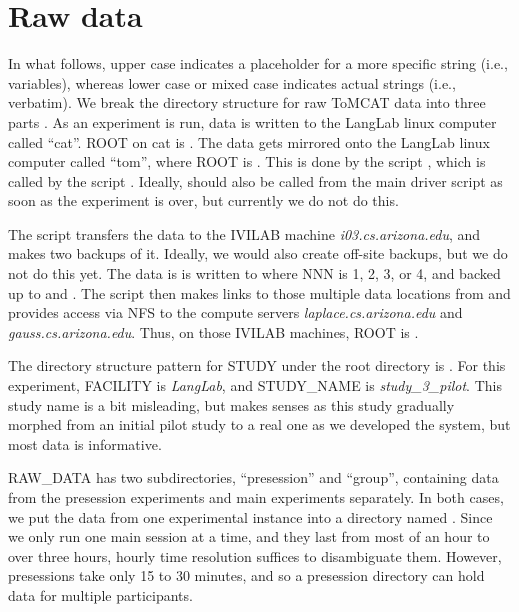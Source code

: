 \section{Raw data}

In what follows, upper case indicates
a placeholder for a more specific string (i.e., variables), whereas lower case or mixed case
indicates actual strings (i.e., verbatim).
We break the directory structure for raw ToMCAT data into three parts
. 
As an experiment is run, data is written to the LangLab linux computer called
``cat''. ROOT on cat is
. The data gets mirrored onto the LangLab linux computer called
``tom'', where ROOT is . 
This is done by the script , which is called by the script 
. Ideally,  should also be
called from the main driver script as soon as the experiment is over, but
currently we do not do this. 

The script  transfers the data to the IVILAB machine
\textit{i03.cs.arizona.edu}, and makes two backups of it.  Ideally, we would
also create off-site backups, but we do not do this yet. The data is is
written to
 where NNN is 1, 2, 3, or 4, and backed up to 
 and .  
The script  then makes links to those multiple data
locations from  and provides access via NFS to the compute
servers \textit{laplace.cs.arizona.edu} and \textit{gauss.cs.arizona.edu}.
Thus, on those IVILAB machines, ROOT is .

The directory structure pattern for STUDY under the root directory is
. For this experiment, FACILITY is
\textit{LangLab}, and STUDY\_NAME is \textit{study\_3\_pilot}.
This study name is a bit misleading, but makes senses as this study
gradually morphed from an initial pilot study to a real one as we developed the
system, but most data is informative. 

RAW\_DATA has two subdirectories, ``presession'' and ``group'', containing data
from the presession experiments and main experiments separately. In both cases, we put the
data from one experimental instance into a directory named
. Since we only run one main session at a time, and
they last from most of an hour to over three hours, hourly time resolution
suffices to disambiguate them. However, presessions take only 15 to 30 minutes,
and so a presession directory can hold data for multiple participants. 

